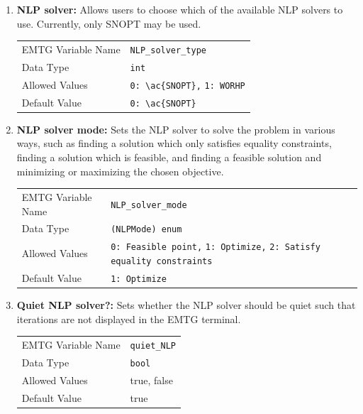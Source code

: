 \begin{enumerate}

    \item \textbf{\ac{NLP} solver:} Allows users to choose which of the available \ac{NLP} solvers to use. Currently, only \ac{SNOPT} may be used.
        \begin{table}[H]
            \hspace{2cm}
            \begin{tabular}{lp{5cm}}
            \ac{EMTG} Variable Name & \verb|NLP_solver_type| \\
            Data Type & \verb|int| \\
            Allowed Values & \verb|0: \ac{SNOPT},| \newline
                            \verb|1: WORHP|  \\
            Default Value & \verb|0: \ac{SNOPT}| \\
            \end{tabular}
        \end{table}

    \item \textbf{\ac{NLP} solver mode:} Sets the \ac{NLP} solver to solve the problem in various ways, such as finding a solution which only satisfies equality constraints, finding a solution which is feasible, and finding a feasible solution and minimizing or maximizing the chosen objective.
        \begin{table}[H]
            \hspace{2cm}
            \begin{tabular}{lp{5cm}}
            \ac{EMTG} Variable Name & \verb|NLP_solver_mode| \\
            Data Type & \verb|(NLPMode) enum| \\
            Allowed Values & \verb|0: Feasible point,| \newline
                            \verb|1: Optimize,| \newline
                            \verb|2: Satisfy equality constraints| \\
            Default Value & \verb|1: Optimize| \\
            \end{tabular}
        \end{table}
    
    \item \textbf{Quiet \ac{NLP} solver?:} Sets whether the \ac{NLP} solver should be quiet such that iterations are not displayed in the \ac{EMTG} terminal.
        \begin{table}[H]
            \hspace{2cm}
            \begin{tabular}{lp{5cm}}
            \ac{EMTG} Variable Name & \verb|quiet_NLP| \\
            Data Type & \verb|bool| \\
            Allowed Values & true, false \\
            Default Value & true \\
            \end{tabular}
        \end{table}


\end{enumerate}
